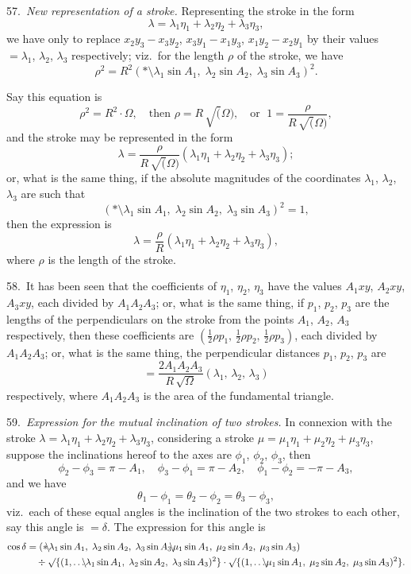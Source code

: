 \documentclass[11pt,a4paper]{book}
\begin{document}
57.\ \textit{New representation of a stroke.} Representing the stroke in the form
\[
\lambda = \lambda_1 \eta_1 + \lambda_2 \eta_2 + \lambda_3 \eta_3,
\]
we have only to replace $x_2 y_3 - x_3 y_2$, $x_3 y_1 - x_1 y_3$, $x_1 y_2 - x_2 y_1$
by their values $= \lambda_1$, $\lambda_2$, $\lambda_3$ respectively; viz.\ for the length $\rho$ of the stroke,
we have
\[
\rho^2 = R^2
(*\!\mathbin{\!\!\setminus\!\!}\lambda_1 \sin A_1,\;
\lambda_2 \sin A_2,\;
\lambda_3 \sin A_3)^2.
\]

Say this equation is
\[
\rho^2 = R^2 \cdot \Omega, \quad \text{then } \rho = R\, \surd(\Omega),
\quad \text{or }\; 1 = \frac{\rho}{R\, \surd(\Omega)},
\]
and the stroke may be represented in the form
\[
\lambda = \frac{\rho}{R\, \surd(\Omega)}
(\lambda_1 \eta_1 + \lambda_2 \eta_2 + \lambda_3 \eta_3);
\]
or, what is the same thing, if the absolute magnitudes of the coordinates
$\lambda_1$, $\lambda_2$, $\lambda_3$ are such that
\[
(*\!\mathbin{\!\!\setminus\!\!}\lambda_1 \sin A_1,\;
\lambda_2 \sin A_2,\;
\lambda_3 \sin A_3)^2 = 1,
\]
then the expression is
\[
\lambda = \frac{\rho}{R} (\lambda_1 \eta_1 + \lambda_2 \eta_2 + \lambda_3 \eta_3),
\]
where $\rho$ is the length of the stroke.

58.\ It has been seen that the coefficients of $\eta_1$, $\eta_2$, $\eta_3$ have the values
$A_1 xy$, $A_2 xy$, $A_3 xy$, each divided by $A_1 A_2 A_3$; or, what is the same thing,
if $p_1$, $p_2$, $p_3$ are the lengths of the perpendiculars on the stroke from the points
$A_1$, $A_2$, $A_3$ respectively, then these coefficients are
$(\tfrac12 \rho p_1,\, \tfrac12 \rho p_2,\, \tfrac12 \rho p_3)$, each divided by $A_1 A_2 A_3$;
or, what is the same thing, the perpendicular distances $p_1$, $p_2$, $p_3$ are
\[
= \frac{2 A_1 A_2 A_3}{R\, \surd\Omega}
(\lambda_1,\, \lambda_2,\, \lambda_3)
\]
respectively, where $A_1 A_2 A_3$ is the area of the fundamental triangle.

59.\ \textit{Expression for the mutual inclination of two strokes.} In connexion with the
stroke $\lambda = \lambda_1 \eta_1 + \lambda_2 \eta_2 + \lambda_3 \eta_3$, considering a stroke
$\mu = \mu_1 \eta_1 + \mu_2 \eta_2 + \mu_3 \eta_3$, suppose the inclinations hereof to the axes
are $\phi_1$, $\phi_2$, $\phi_3$, then
\[
\phi_2 - \phi_3 = \pi - A_1, \quad
\phi_3 - \phi_1 = \pi - A_2, \quad
\phi_1 - \phi_2 = -\pi - A_3,
\]
and we have
\[
\theta_1 - \phi_1 = \theta_2 - \phi_2 = \theta_3 - \phi_3,
\]
viz.\ each of these equal angles is the inclination of the two strokes to each other,
say this angle is $= \delta$. The expression for this angle is
\begin{align*}
\cos \delta &=
(*\!\mathbin{\!\!\setminus\!\!}\lambda_1 \sin A_1,\;
\lambda_2 \sin A_2,\;
\lambda_3 \sin A_3 \!\mathbin{\!\!\setminus\!\!}
\mu_1 \sin A_1,\;
\mu_2 \sin A_2,\;
\mu_3 \sin A_3)\\
& \quad \div
\surd\{(1, \ldots \!\mathbin{\!\!\setminus\!\!}
\lambda_1 \sin A_1,\;
\lambda_2 \sin A_2,\;
\lambda_3 \sin A_3)^2\} \cdot
\surd\{(1, \ldots \!\mathbin{\!\!\setminus\!\!}
\mu_1 \sin A_1,\;
\mu_2 \sin A_2,\;
\mu_3 \sin A_3)^2\}.
\end{align*}
\end{document}
